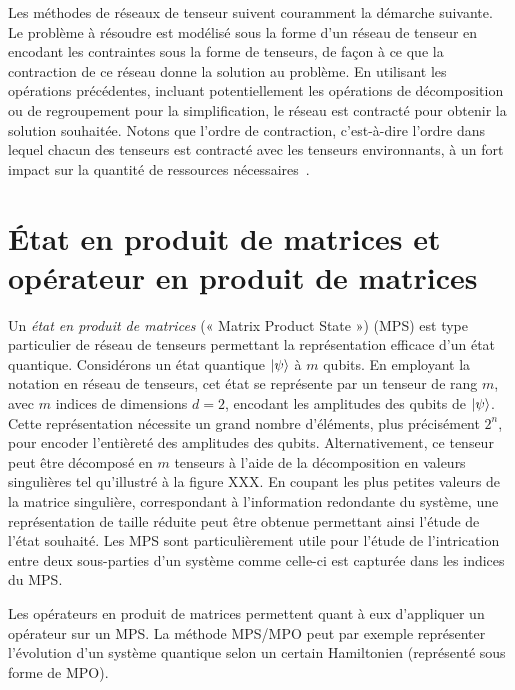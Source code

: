 Les méthodes de réseaux de tenseur suivent couramment la démarche suivante. Le problème à résoudre est modélisé sous la forme d'un réseau de tenseur en encodant les contraintes sous la forme de tenseurs, de façon à ce que la contraction de ce réseau donne la solution au problème. En utilisant les opérations précédentes, incluant potentiellement les opérations de décomposition ou de regroupement pour la simplification, le réseau est contracté pour obtenir la solution souhaitée. Notons que l'ordre de contraction, c'est-à-dire l'ordre dans lequel chacun des tenseurs est contracté avec les tenseurs environnants, à un fort impact sur la quantité de ressources nécessaires~\cite{grayHyperoptimizedTensorNetwork2021}.


\section{État en produit de matrices et opérateur en produit de matrices}
\label{sec:mps-mpo}

Un \textit{état en produit de matrices} (« Matrix Product State ») (MPS) est type particulier de réseau de tenseurs permettant la représentation efficace d'un état quantique. Considérons un état quantique $\ket{\psi}$ à $m$ qubits. En employant la notation en réseau de tenseurs, cet état se représente par un tenseur de rang $m$, avec $m$ indices de dimensions $d=2$, encodant les amplitudes des qubits de $\ket{\psi}$. Cette représentation nécessite un grand nombre d'éléments, plus précisément $2^{n}$, pour encoder l'entièreté des amplitudes des qubits. Alternativement, ce tenseur peut être décomposé en $m$ tenseurs à l'aide de la décomposition en valeurs singulières tel qu'illustré à la figure XXX. En coupant les plus petites valeurs de la matrice singulière, correspondant à l'information redondante du système, une représentation de taille réduite peut être obtenue permettant ainsi l'étude de l'état souhaité. Les MPS sont particulièrement utile pour l'étude de l'intrication entre deux sous-parties d'un système comme celle-ci est capturée dans les indices du MPS.

Les opérateurs en produit de matrices permettent quant à eux d'appliquer un opérateur sur un MPS. La méthode MPS/MPO peut par exemple représenter l'évolution d'un système quantique selon un certain Hamiltonien (représenté sous forme de MPO).



